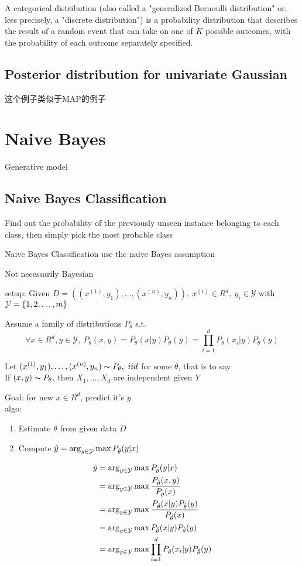 \documentclass{article}
\begin{document}
A categorical distribution (also called a "generalized Bernoulli distribution" or, less precisely, a "discrete distribution") 
is a probability distribution that describes the result of a random event that can take on one of $K$ possible outcomes, 
with the probability of each outcome separately specified.

\subsection{Posterior distribution for univariate Gaussian}
这个例子类似于MAP的例子

\section{Naive Bayes}
Generative model
\subsection{Naive Bayes Classification}
Find out the probability of the previously unseen instance belonging to each class, then simply pick the most probable class

Naive Bayes Classification use the naive Bayes assumption

Not necessarily Bayesian

setup: Given $D = ((x^{(1)}, y_1), \ldots, (x^{(n)}, y_n)),\ x^{(i)} \in R^d,\ y_i \in \mathcal{Y}$ with $\mathcal{Y} = \{1,2,\ldots, m\}$

Assume a family of distributions $P_\theta$ s.t.
$$\forall x \in R^d, y \in \mathcal{Y},\ P_\theta(x,y) = P_\theta(x|y) P_\theta(y) = \prod_{i=1}^d P_\theta(x_i|y) P_\theta(y)$$

Let $(x^{(1)}, y_1), \ldots, (x^{(n)}, y_n) \thicksim{P}_\theta,\ iid$ for some $\theta$, that is to say\\
If $(x,y) \thicksim{P}_\theta$, then $X_1, \ldots, X_d$ are independent given $Y$

Goal: for new $x \in R^d$, predict it's $y$\\
algo: 
\begin{enumerate}
\item Estimate $\theta$ from given data $D$
\item Compute $\hat{y} = \arg_{y \in \mathcal{Y}} \max P_{\hat{\theta}}(y|x)$
\end{enumerate}

$$
\begin{aligned}
\hat{y} 
& = \arg_{y \in \mathcal{Y}} \max P_{\hat{\theta}}(y|x) \\
& = \arg_{y \in \mathcal{Y}} \max \dfrac{P_{\hat{\theta}} (x,y)}{ P_{\hat{\theta}}(x) } \\
& = \arg_{y \in \mathcal{Y}} \max \dfrac{P_{\hat{\theta}} (x|y) P_{\hat{\theta}}(y)}{ P_{\hat{\theta}}(x) } \\
& = \arg_{y \in \mathcal{Y}} \max P_{\hat{\theta}} (x|y) P_{\hat{\theta}}(y) \\
& = \arg_{y \in \mathcal{Y}} \max \prod_{i=1}^d P_{\hat{\theta}} (x_i|y) P_{\hat{\theta}}(y) \\
\end{aligned}
$$
\end{document}
